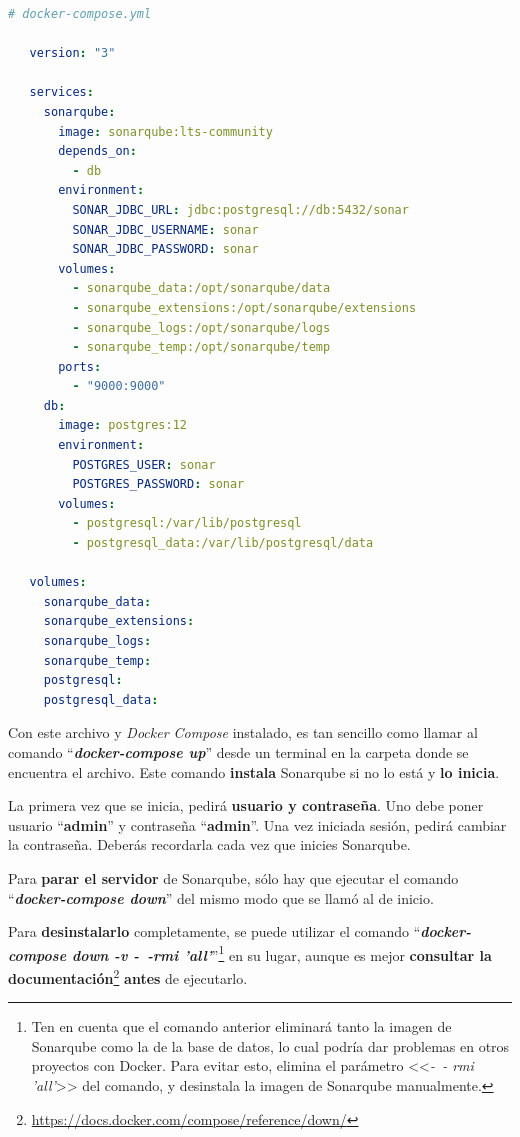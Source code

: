 \documentclass[11pt,spanish,listoffigures,listoftables,table,hyphens,dvipsnames]{tfgetsinf}
\begin{document}
\begin{lstlisting}[language=YAML]
   # docker-compose.yml

   version: "3"

   services:
     sonarqube:
       image: sonarqube:lts-community
       depends_on:
         - db
       environment:
         SONAR_JDBC_URL: jdbc:postgresql://db:5432/sonar
         SONAR_JDBC_USERNAME: sonar
         SONAR_JDBC_PASSWORD: sonar
       volumes:
         - sonarqube_data:/opt/sonarqube/data
         - sonarqube_extensions:/opt/sonarqube/extensions
         - sonarqube_logs:/opt/sonarqube/logs
         - sonarqube_temp:/opt/sonarqube/temp
       ports:
         - "9000:9000"
     db:
       image: postgres:12
       environment:
         POSTGRES_USER: sonar
         POSTGRES_PASSWORD: sonar
       volumes:
         - postgresql:/var/lib/postgresql
         - postgresql_data:/var/lib/postgresql/data
   
   volumes:
     sonarqube_data:
     sonarqube_extensions:
     sonarqube_logs:
     sonarqube_temp:
     postgresql:
     postgresql_data:   
\end{lstlisting}

Con este archivo y \emph{Docker Compose} instalado, es tan sencillo como llamar al comando ``\textbf{\emph{docker-compose up}}'' desde un terminal en la carpeta donde se encuentra el archivo. Este comando \textbf{instala} Sonarqube si no lo está y \textbf{lo inicia}.

La primera vez que se inicia, pedirá \textbf{usuario y contraseña}. Uno debe poner usuario ``\textbf{admin}'' y contraseña ``\textbf{admin}''. Una vez iniciada sesión, pedirá cambiar la contraseña. Deberás recordarla cada vez que inicies Sonarqube.

Para \textbf{parar el servidor} de Sonarqube, sólo hay que ejecutar el comando  ``\textbf{\emph{docker-compose down}}'' del mismo modo que se llamó al de inicio.

Para \textbf{desinstalarlo} completamente, se puede utilizar el comando ``\textbf{\emph{docker-compose down -v -~-rmi 'all'}}''\footnote{Ten en cuenta que el comando anterior eliminará tanto la imagen de Sonarqube como la de la base de datos, lo cual podría dar problemas en otros proyectos con Docker. Para evitar esto, elimina el parámetro <<\emph{-~- rmi 'all'}>> del comando, y desinstala la imagen de Sonarqube manualmente.} en su lugar, aunque es mejor \textbf{consultar la documentación}\footnote{\url{https://docs.docker.com/compose/reference/down/}} \textbf{antes} de ejecutarlo. 
\end{document}
